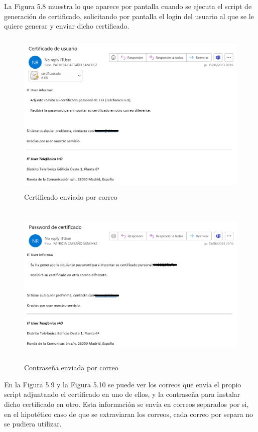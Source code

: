 \documentclass[a4paper, 12pt]{book}
\begin{document}
\begin{itemize}
La Figura 5.8 muestra lo que aparece por pantalla cuando se ejecuta el script de generación de certificado, solicitando por pantalla el login del usuario al que se le quiere generar y enviar dicho certificado.

\begin{figure}[H]
	\centering
	\includegraphics[width=15cm, height=8cm, keepaspectratio]{img/image09.png}
	\caption{Certificado enviado por correo}
	\label{fig:image09}
\end{figure}

\begin{figure}[H]
	\centering
	\includegraphics[width=15cm, height=8cm, keepaspectratio]{img/image10.png}
	\caption{Contraseña enviada por correo}
	\label{fig:image10}
\end{figure}

En la Figura 5.9 y la Figura 5.10 se puede ver los correos que envía el propio script adjuntando el certificado en uno de ellos, y la contraseña para instalar dicho certificado en otro. Esta información se envía en correos separados por si, en el hipotético caso de que se extraviaran los correos, cada correo por separa no se pudiera utilizar.


\end{itemize}
\end{document}
